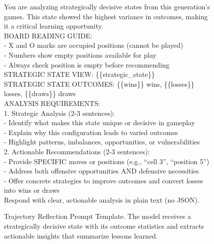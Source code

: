 \begin{figure}[H]
\centering

\begin{tcolorbox}[
    colback=blue!5!white,
    colframe=blue!40!white,
    left=1mm, right=1mm, top=1mm, bottom=1mm,
    width=\textwidth,
    enhanced,
    attach boxed title to top center={yshift=-2mm},
    boxed title style={colback=blue!40!white},
    title={Trajectory Reflection Prompt Template},
    fontupper=\footnotesize,
    fonttitle=\small,
    label=box:reflection_prompt
]
You are analyzing strategically decisive states from this generation's games.
This state showed the highest variance in outcomes, making it a critical learning opportunity.\\

BOARD READING GUIDE:\\
- X and O marks are occupied positions (cannot be played)\\
- Numbers show empty positions available for play\\
- Always check position is empty before recommending\\

STRATEGIC STATE VIEW: \{\{strategic\_state\}\}\\
STRATEGIC STATE OUTCOMES: \{\{wins\}\} wins, \{\{losses\}\} losses, \{\{draws\}\} draws\\

ANALYSIS REQUIREMENTS:\\
1. Strategic Analysis (2-3 sentences):\\
\hspace*{1em}- Identify what makes this state unique or decisive in gameplay\\
\hspace*{1em}- Explain why this configuration leads to varied outcomes\\
\hspace*{1em}- Highlight patterns, imbalances, opportunities, or vulnerabilities\\

2. Actionable Recommendations (2-3 sentences):\\
\hspace*{1em}- Provide SPECIFIC moves or positions (e.g., ``cell 3'', ``position 5'')\\
\hspace*{1em}- Address both offensive opportunities AND defensive necessities\\
\hspace*{1em}- Offer concrete strategies to improve outcomes and convert losses into wins or draws\\

Respond with clear, actionable analysis in plain text (no JSON).
\end{tcolorbox}

\caption{Trajectory Reflection Prompt Template. The model receives a strategically decisive state with its outcome statistics and extracts actionable insights that summarize lessons learned.}
\label{fig:reflection_prompt_template}
\end{figure}


